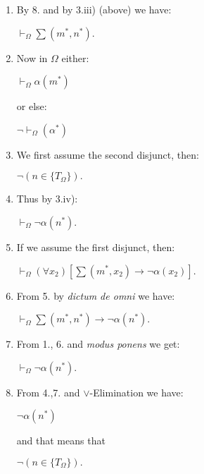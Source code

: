\documentclass[12pt]{article}
\begin{document}
\begin{enumerate}
\item By 8. and by 3.iii) (above) we have:

\begin{center}
$\vdash_{\Omega} \sum (m^*, n^*).$
\end{center}

\item Now in $\Omega$ either:

\begin{center}
$\vdash_{\Omega} \alpha (m^*)$
\end{center}

or else:

\begin{center}
$\neg \vdash_{\Omega} (\alpha^*)$
\end{center}
 
\item We first assume the second disjunct, then:

\begin{center}
$\neg (n \in \{ T_{\Omega} \}).$
\end{center}

\item Thus by 3.iv):

\begin{center}
$\vdash_{\Omega} \neg \alpha (n^*).$
\end{center}

\item If we assume the first disjunct, then:

\begin{center}
$\vdash_{\Omega} (\forall x_2) [\sum (m^*, x_2) \to \neg \alpha (x_2)].$
\end{center}

\item From 5. by \emph{dictum de omni} we have:

\begin{center}
$\vdash_{\Omega} \sum (m^*, n^*) \to \neg \alpha (n^*).$
\end{center}

\item From 1., 6. and \emph{modus ponens} we get:

\begin{center}
$\vdash_{\Omega} \neg \alpha (n^*).$
\end{center}

\item From 4.,7. and $\vee$-Elimination we have:

\begin{center}
$\neg \alpha (n^*)$
\end{center}

and that means that

\begin{center}
$\neg (n \in \{ T_{\Omega} \}).$
\end{center}
\end{enumerate}
\end{document}
